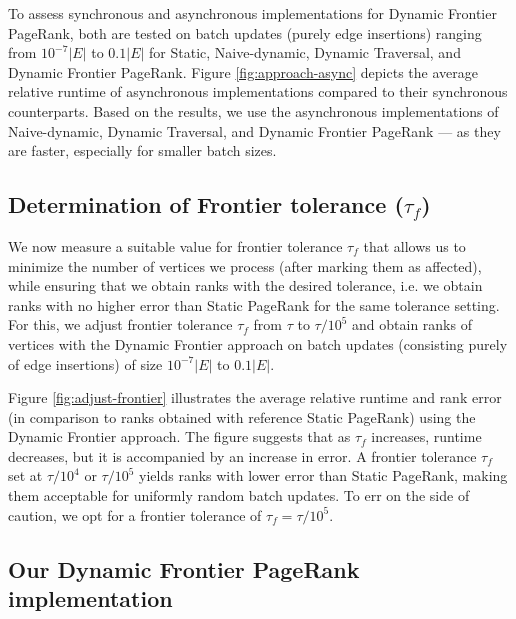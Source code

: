 To assess synchronous and asynchronous implementations for Dynamic Frontier PageRank, both are tested on batch updates (purely edge insertions) ranging from $10^{-7}|E|$ to $0.1|E|$ for Static, Naive-dynamic, Dynamic Traversal, and Dynamic Frontier PageRank. Figure \ref{fig:approach-async} depicts the average relative runtime of asynchronous implementations compared to their synchronous counterparts. Based on the results, we use the asynchronous implementations of Naive-dynamic, Dynamic Traversal, and Dynamic Frontier PageRank --- as they are faster, especially for smaller batch sizes.




\subsection{Determination of Frontier tolerance ($\tau_f$)}

We now measure a suitable value for frontier tolerance $\tau_f$ that allows us to minimize the number of vertices we process (after marking them as affected), while ensuring that we obtain ranks with the desired tolerance, i.e. we obtain ranks with no higher error than Static PageRank for the same tolerance setting. For this, we adjust frontier tolerance $\tau_f$ from $\tau$ to $\tau / 10^5$ and obtain ranks of vertices with the Dynamic Frontier approach on batch updates (consisting purely of edge insertions) of size $10^{-7}|E|$ to $0.1|E|$.

Figure \ref{fig:adjust-frontier} illustrates the average relative runtime and rank error (in comparison to ranks obtained with reference Static PageRank) using the Dynamic Frontier approach. The figure suggests that as $\tau_f$ increases, runtime decreases, but it is accompanied by an increase in error. A frontier tolerance $\tau_f$ set at $\tau/10^4$ or $\tau/10^5$ yields ranks with lower error than Static PageRank, making them acceptable for uniformly random batch updates. To err on the side of caution, we opt for a frontier tolerance of $\tau_f = \tau/10^5$.








\subsection{Our Dynamic Frontier PageRank implementation}

